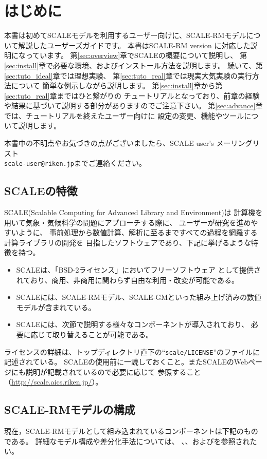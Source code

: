 \section{はじめに}

本書は初めてSCALEモデルを利用するユーザー向けに、SCALE-RMモデルについて解説したユーザーズガイドです。
本書はSCALE-RM version \version に対応した説明になっています。
第\ref{sec:overview}章でSCALEの概要について説明し、
第\ref{sec:install}章で必要な環境、およびインストール方法を説明します。
%
続いて、第\ref{sec:tuto_ideal}章では理想実験、
第\ref{sec:tuto_real}章では現実大気実験の実行方法について
簡単な例示しながら説明します。
第\ref{sec:install}章から第\ref{sec:tuto_real}章まではひと繋がりの
チュートリアルとなっており、前章の経験や結果に基づいて説明する部分がありますのでご注意下さい。
%
第\ref{sec:advance}章では、チュートリアルを終えたユーザー向けに
設定の変更、機能やツールについて説明します。

本書中の不明点やお気づきの点がございましたら、SCALE user's メーリングリスト\\
 \verb|scale-user@riken.jp|までご連絡ください。



\subsection{SCALEの特徴}
SCALE(Scalable Computing for Advanced Library and Environment)は
計算機を用いて気象・気候科学の問題にアプローチする際に、
ユーザーが研究を進めやすいように、
事前処理から数値計算、解析に至るまですべての過程を網羅する計算ライブラリの開発を
目指したソフトウェアであり、下記に挙げるような特徴を持つ。
\begin{itemize}
\item SCALEは、「BSD-2ライセンス」においてフリーソフトウェア
として提供されており、商用、非商用に関わらず自由な利用・改変が可能である。
\item SCALEには、SCALE-RMモデル、SCALE-GMといった組み上げ済みの数値モデルが含まれている。
\item SCALEには、次節で説明する様々なコンポーネントが導入されており、
必要に応じて取り替えることが可能である。
\end{itemize}

ライセンスの詳細は、トップディレクトリ直下の``\verb|scale/LICENSE|''のファイルに記述されている。
SCALEの使用前に一読しておくこと。またSCALEのWebページにも説明が記載されているので必要に応じて
参照すること（\url{http://scale.aics.riken.jp/}）。

\subsection{SCALE-RMモデルの構成}
現在，SCALE-RMモデルとして組み込まれているコンポーネントは下記のものである。
詳細なモデル構成や差分化手法については、
\cite{scale_2015}、\cite{satoy_2015b}、および\cite{nishizawa_2015}を参照されたい。\\


